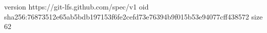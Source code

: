 version https://git-lfs.github.com/spec/v1
oid sha256:76873512e65ab5bdb197153f6fe2cefd73e76394b9f015b53e94077cff438572
size 62
